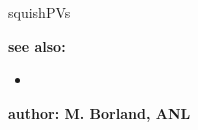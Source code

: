 \begin{sddsprog}{squishPVs}
\item {\bf see also:}
    \begin{itemize}
%
%
    \item {}
    \end{itemize}
%
%
\item {\bf author: M. Borland, ANL} 
\end{sddsprog}
